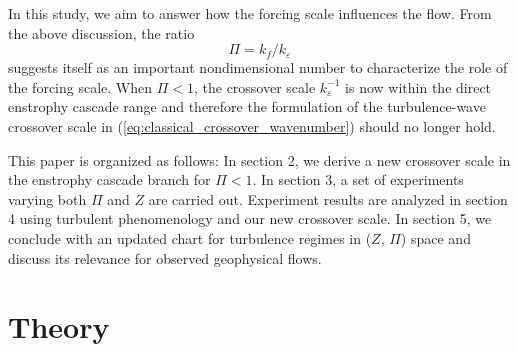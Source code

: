 \documentclass{jfm}
\begin{document}
In this study, we aim to answer how the forcing scale influences the
flow. From the above discussion, the ratio
\begin{equation}
\Pi=k_{f}/k_{\varepsilon}\label{eq:def_Pi_index}
\end{equation}
suggests itself as an important nondimensional number to characterize
the role of the forcing scale. When $\Pi<1$, the crossover scale $k_{\varepsilon}^{-1}$
is now within the direct enstrophy cascade range and therefore the formulation
of the turbulence-wave crossover scale in (\ref{eq:classical_crossover_wavenumber})
should no longer hold. 

This paper is organized
as follows: In section 2, we derive a new crossover scale in the
enstrophy cascade branch for $\Pi<1$. In section 3, a set of experiments
varying both $\Pi$ and $Z$ are carried out. Experiment results are
analyzed in section 4 using turbulent phenomenology
and our new crossover scale. In section 5, we conclude with an updated
chart for turbulence regimes in ($Z$, $\Pi$) space and discuss
its relevance for observed geophysical flows.


\section{Theory}
\end{document}
